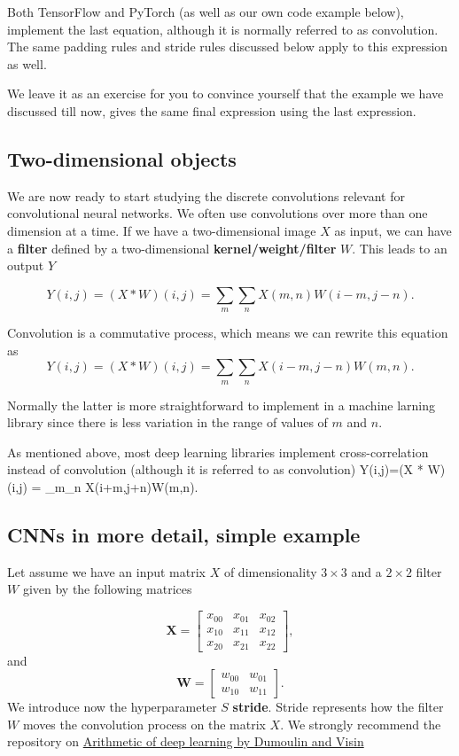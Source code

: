 \documentclass[%
oneside,                 %
final,                   %
10pt]{article}
\begin{document}
Both TensorFlow and PyTorch (as well as our own code example below),
implement the last equation, although it is normally referred to as
convolution.  The same padding rules and stride rules discussed below
apply to this expression as well.

We leave it as an exercise for you to convince yourself that the example we have discussed till now, gives the same final expression using the last expression.

\subsection{Two-dimensional objects}

We are now ready to start studying the discrete convolutions relevant for convolutional neural networks.
We often use convolutions over more than one dimension at a time. If
we have a two-dimensional image $X$ as input, we can have a \textbf{filter}
defined by a two-dimensional \textbf{kernel/weight/filter} $W$. This leads to an output $Y$

\[
Y(i,j)=(X * W)(i,j) = \sum_m\sum_n X(m,n)W(i-m,j-n).
\]

Convolution is a commutative process, which means we can rewrite this equation as
\[
Y(i,j)=(X * W)(i,j) = \sum_m\sum_n X(i-m,j-n)W(m,n).
\]

Normally the latter is more straightforward to implement in a machine
larning library since there is less variation in the range of values
of $m$ and $n$.

As mentioned above, most deep learning libraries implement
cross-correlation instead of convolution (although it is referred to as
convolution)
Y(i,j)=(X * W)(i,j) = \sum_m\sum_n X(i+m,j+n)W(m,n).
\]

\subsection{CNNs in more detail, simple example}

Let assume we have an input matrix $X$ of dimensionality $3\times 3$
and a $2\times 2$ filter $W$ given by the following matrices

\[
\bm{X}=\begin{bmatrix}x_{00} & x_{01} & x_{02}  \\
                      x_{10} & x_{11} & x_{12}  \\
	              x_{20} & x_{21} & x_{22} \end{bmatrix},
\]
and 
\[
\bm{W}=\begin{bmatrix}w_{00} & w_{01} \\
	              w_{10} & w_{11}\end{bmatrix}.
\]
We introduce now the hyperparameter $S$ \textbf{stride}. Stride represents how the filter $W$ moves the convolution process on the matrix $X$.
We strongly recommend the repository on \href{{https://github.com/vdumoulin/conv_arithmetic}}{Arithmetic of deep learning by Dumoulin and Visin} 
\end{document}
